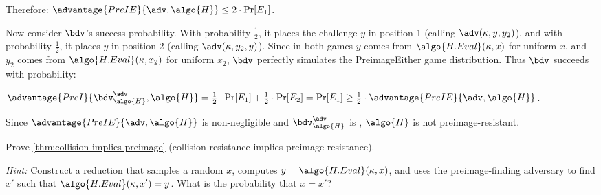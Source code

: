 \begin{mysolution}
  Therefore: $\advantage{PreIE}{\adv, \algo{H}} \leq 2 \cdot \Pr[E_1]$.
  
  Now consider $\bdv$'s success probability. With probability $\frac{1}{2}$, it places the challenge $y$ in position 1 (calling $\adv(\kappa, y, y_2)$), and with probability $\frac{1}{2}$, it places $y$ in position 2 (calling $\adv(\kappa, y_2, y)$).
  Since in both games $y$ comes from $\algo{H.Eval}(\kappa, x)$ for uniform $x$, and $y_2$ comes from $\algo{H.Eval}(\kappa, x_2)$ for uniform $x_2$, $\bdv$ perfectly simulates the PreimageEither game distribution. Thus $\bdv$ succeeds with probability:
  
  $\advantage{PreI}{\bdv^\adv_\algo{H}, \algo{H}} = \frac{1}{2} \cdot \Pr[E_1] + \frac{1}{2} \cdot \Pr[E_2] = \Pr[E_1] \geq \frac{1}{2} \cdot \advantage{PreIE}{\adv, \algo{H}}$.
  
  Since $\advantage{PreIE}{\adv, \algo{H}}$ is non-negligible and $\bdv^\adv_\algo{H}$ is \ppt, $\algo{H}$ is not preimage-resistant.
\end{mysolution}
\fi

\begin{exercise}\label{ex:collision-implies-preimage}
  Prove \autoref{thm:collision-implies-preimage} (collision-resistance implies preimage-resistance).
  
  \emph{Hint:} Construct a reduction that samples a random $x$, computes $y = \algo{H.Eval}(\kappa, x)$, and uses the preimage-finding adversary to find $x'$ such that $\algo{H.Eval}(\kappa, x') = y$. What is the probability that $x = x'$?
\end{exercise}

